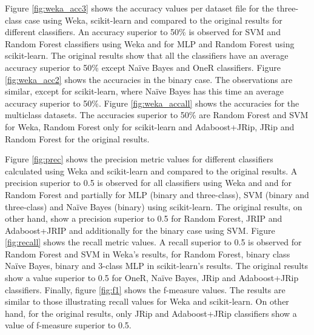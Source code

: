 Figure \ref{fig:weka_acc3} shows the accuracy values per dataset file for the three-class case using Weka, scikit-learn and compared to the original results for different classifiers. An accuracy superior to 50\% is observed for SVM and Random Forest classifiers using Weka and for MLP and Random Forest using scikit-learn. The original results show that all the classifiers have an average accuracy superior to 50\% except Naïve Bayes and OneR classifiers. Figure \ref{fig:weka_acc2} shows the accuracies in the binary case. The observations are similar, except for scikit-learn, where Naïve Bayes has this time an average accuracy superior to 50\%. Figure \ref{fig:weka_accall} shows the accuracies for the multiclass datasets. The accuracies superior to 50\% are Random Forest and SVM for Weka, Random Forest only for scikit-learn and Adaboost+JRip, JRip and Random Forest for the original results.

Figure \ref{fig:prec} shows the precision metric values for different classifiers calculated using Weka and scikit-learn and compared to the original results. A precision superior to 0.5 is observed for all classifiers using Weka and and for Random Forest and partially for MLP (binary and three-class), SVM (binary and three-class) and Naïve Bayes (binary) using scikit-learn. The original results, on other hand, show a precision superior to 0.5 for Random Forest, JRIP and Adaboost+JRIP and additionally for the binary case using SVM. Figure \ref{fig:recall} shows the recall metric values. A recall superior to 0.5 is observed for Random Forest and SVM in Weka's results, for Random Forest, binary class Naïve Bayes, binary and 3-class MLP in scikit-learn's results. The original results show a value superior to 0.5 for OneR, Naïve Bayes, JRip and Adaboost+JRip classifiers. Finally, figure \ref{fig:f1} shows the f-measure values. The results are similar to those illustrating recall values for Weka and scikit-learn. On other hand, for the original results, only JRip and Adaboost+JRip classifiers show a value of f-measure superior to 0.5.  

